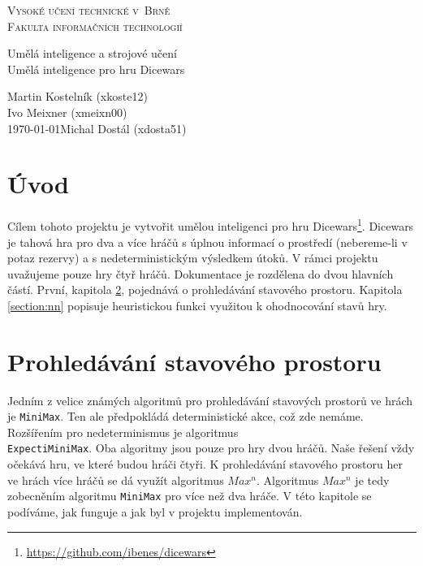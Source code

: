 \documentclass[a4paper,11pt]{article}
\begin{document}
	\begin{titlepage}
		\begin{center}
			\textsc{\Huge Vysoké učení technické v~Brně\\
				\vspace{0.4em}\huge Fakulta informačních technologií}
			
			
			{\LARGE Umělá inteligence a strojové učení\\
				\Huge Umělá inteligence pro hru Dicewars\\ \vspace{0.3em}}
			
			
			{\Large \hfill Martin Kostelník (xkoste12)\\ \hfill Ivo Meixner (xmeixn00)\\ \today \hfill Michal Dostál (xdosta51)}
		\end{center}
	\end{titlepage}

	\section{Úvod}
		Cílem tohoto projektu je vytvořit umělou inteligenci pro hru Dicewars\footnote{\url{https://github.com/ibenes/dicewars}}. Dicewars je tahová hra pro dva a více hráčů s úplnou informací o prostředí (nebereme-li v potaz rezervy) a s nedeterministickým výsledkem útoků. V rámci projektu uvažujeme pouze hry čtyř hráčů. Dokumentace je rozdělena do dvou hlavních částí. První, kapitola \ref{section:search}, pojednává o prohledávání stavového prostoru. Kapitola \ref{section:nn} popisuje heuristickou funkci využitou k ohodnocování stavů hry.
		
	\section{Prohledávání stavového prostoru}
	\label{section:search}
		Jedním z velice známých algoritmů pro prohledávání stavových prostorů ve hrách je \texttt{MiniMax}. Ten ale předpokládá deterministické akce, což zde nemáme. Rozšířením pro nedeterminismus je algoritmus\\\texttt{ExpectiMiniMax}. Oba algoritmy jsou pouze pro hry dvou hráčů. Naše řešení vždy očekává hru, ve které budou hráči čtyři. K prohledávání stavového prostoru her ve hrách více hráčů se dá využít algoritmus \texttt{$Max^n$}. Algoritmus \texttt{$Max^n$} je tedy zobecněním algoritmu \texttt{MiniMax} pro více než dva hráče. V této kapitole se podíváme, jak funguje a jak byl v projektu implementován.
		
\end{document}
